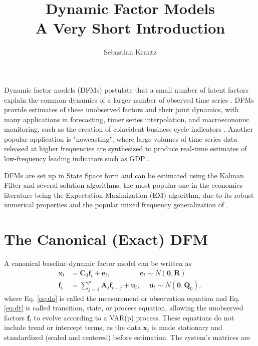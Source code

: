 \documentclass[a4paper]{article}
\title{\textbf{Dynamic Factor Models}\\ A Very Short Introduction}
\author{Sebastian Krantz}
\begin{document}
\maketitle

Dynamic factor models (DFMs) postulate that a small number of latent factors explain the common dynamics of a larger number of observed time series \citep{stock2016dynamic}. DFMs provide estimates of these unobserved factors and their joint dynamics, with many applications in forecasting, timer series interpolation, and macroeconomic monitoring, such as the creation of coincident business cycle indicators \citep{mariano2003new}. Another popular application is "nowcasting", where large volumes of time series data released at higher frequencies are synthesized to produce real-time estimates of low-frequency leading indicators such as GDP \citep{bok2018macroeconomic}. \newline

DFMs are set up in State Space form and can be estimated using the Kalman Filter and several solution algorithms, the most popular one in the economics literature being the Expectation Maximization (EM) algorithm, due to its robust numerical properties \citep{doz2012quasi} and the popular mixed frequency generalization of \citet{banbura2014maximum}. %

\section{The Canonical (Exact) DFM}

A canonical baseline dynamic factor model can be written as
\begin{align} \label{eq:do}
\textbf{x}_t &= \textbf{C}_0 \textbf{f}_t + \textbf{e}_t, \qquad\qquad\, \textbf{e}_t\sim N(\textbf{0}, \textbf{R}) \\ \label{eq:dt}
\textbf{f}_t &= \sum_{j=1}^p \textbf{A}_j \textbf{f}_{t-j} + \textbf{u}_t, \quad\ \textbf{u}_t\sim  N(\textbf{0}, \textbf{Q}_0),
\end{align}
\noindent where Eq. \ref{eq:do} is called the measurement or observation equation and Eq. \ref{eq:dt} is called transition, state, or process equation, allowing the unobserved factors $\textbf{f}_t$ to evolve according to a VAR(p) process. These equations do not include trend or intercept terms, as the data $\textbf{x}_t$ is made stationary and standardized (scaled and centered) before estimation. The system's matrices are \newline
\end{document}
